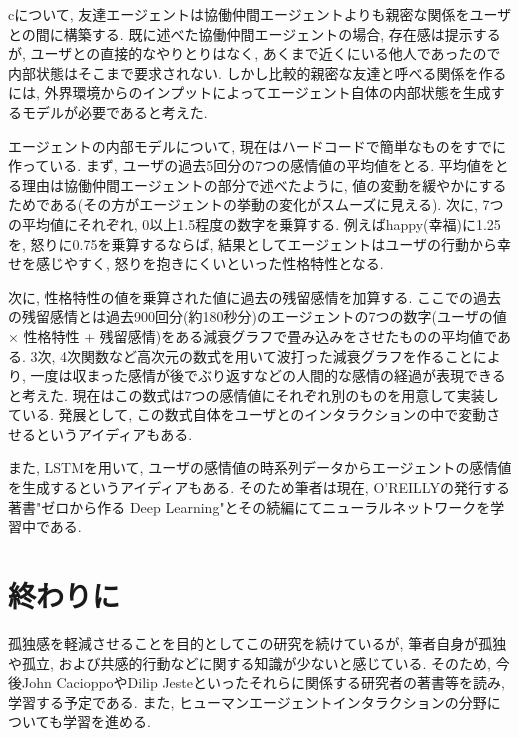 \documentclass[a4paper,dvipdfmx]{hisken}
\begin{document}
\begin{enumerate}
cについて, 友達エージェントは協働仲間エージェントよりも親密な関係をユーザとの間に構築する. 既に述べた協働仲間エージェントの場合, 存在感は提示するが, ユーザとの直接的なやりとりはなく, あくまで近くにいる他人であったので内部状態はそこまで要求されない. しかし比較的親密な友達と呼べる関係を作るには, 外界環境からのインプットによってエージェント自体の内部状態を生成するモデルが必要であると考えた. 

エージェントの内部モデルについて, 現在はハードコードで簡単なものをすでに作っている. まず, ユーザの過去5回分の7つの感情値の平均値をとる. 平均値をとる理由は協働仲間エージェントの部分で述べたように, 値の変動を緩やかにするためである(その方がエージェントの挙動の変化がスムーズに見える). 次に,  7つの平均値にそれぞれ, 0以上1.5程度の数字を乗算する. 例えばhappy(幸福)に1.25を, 怒りに0.75を乗算するならば, 結果としてエージェントはユーザの行動から幸せを感じやすく, 怒りを抱きにくいといった性格特性となる. 

次に, 性格特性の値を乗算された値に過去の残留感情を加算する. ここでの過去の残留感情とは過去900回分(約180秒分)のエージェントの7つの数字(ユーザの値 × 性格特性 + 残留感情)をある減衰グラフで畳み込みをさせたものの平均値である. 3次, 4次関数など高次元の数式を用いて波打った減衰グラフを作ることにより, 一度は収まった感情が後でぶり返すなどの人間的な感情の経過が表現できると考えた. 現在はこの数式は7つの感情値にそれぞれ別のものを用意して実装している. 発展として, この数式自体をユーザとのインタラクションの中で変動させるというアイディアもある. 

また, LSTMを用いて, ユーザの感情値の時系列データからエージェントの感情値を生成するというアイディアもある. そのため筆者は現在, O'REILLYの発行する著書"ゼロから作る Deep Learning"とその続編にてニューラルネットワークを学習中である.

\end{enumerate}


\section{終わりに}
孤独感を軽減させることを目的としてこの研究を続けているが, 筆者自身が孤独や孤立, および共感的行動などに関する知識が少ないと感じている. そのため, 今後John CacioppoやDilip Jesteといったそれらに関係する研究者の著書等を読み, 学習する予定である. また, ヒューマンエージェントインタラクションの分野についても学習を進める.
\end{document}
